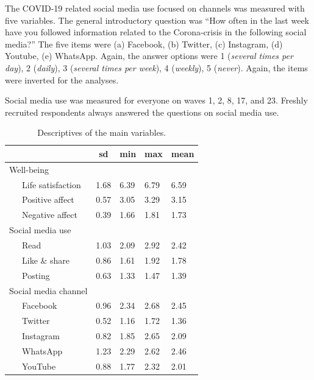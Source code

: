 \documentclass[
  english,
  man,mask,floatsintext]{apa6}
\begin{document}
The COVID-19 related social media use focused on channels was measured with five variables.
The general introductory question was ``How often in the last week have you followed information related to the Corona-crisis in the following social media?''
The five items were (a) Facebook, (b) Twitter, (c) Instagram, (d) Youtube, (e) WhatsApp.
Again, the answer options were 1 (\emph{several times per day}), 2 (\emph{daily}), 3 (\emph{several times per week}), 4 (\emph{weekly}), 5 (\emph{never}).
Again, the items were inverted for the analyses.

Social media use was measured for everyone on waves 1, 2, 8, 17, and 23.
Freshly recruited respondents always answered the questions on social media use.

\begin{table}[tbp]

\begin{center}
\begin{threeparttable}

\caption{\label{tab:descriptives}Descriptives of the main variables.}

\begin{tabular}{lllll}
\toprule
 & \multicolumn{1}{c}{sd} & \multicolumn{1}{c}{min} & \multicolumn{1}{c}{max} & \multicolumn{1}{c}{mean}\\
\midrule
Well-being &  &  &  & \\
\ \ \ Life satisfaction & 1.68 & 6.39 & 6.79 & 6.59\\
\ \ \ Positive affect & 0.57 & 3.05 & 3.29 & 3.15\\
\ \ \ Negative affect & 0.39 & 1.66 & 1.81 & 1.73\\
Social media use &  &  &  & \\
\ \ \ Read & 1.03 & 2.09 & 2.92 & 2.42\\
\ \ \ Like \& share & 0.86 & 1.61 & 1.92 & 1.78\\
\ \ \ Posting & 0.63 & 1.33 & 1.47 & 1.39\\
Social media channel &  &  &  & \\
\ \ \ Facebook & 0.96 & 2.34 & 2.68 & 2.45\\
\ \ \ Twitter & 0.52 & 1.16 & 1.72 & 1.36\\
\ \ \ Instagram & 0.82 & 1.85 & 2.65 & 2.09\\
\ \ \ WhatsApp & 1.23 & 2.29 & 2.62 & 2.46\\
\ \ \ YouTube & 0.88 & 1.77 & 2.32 & 2.01\\
\bottomrule
\end{tabular}

\end{threeparttable}
\end{center}

\end{table}
\end{document}
